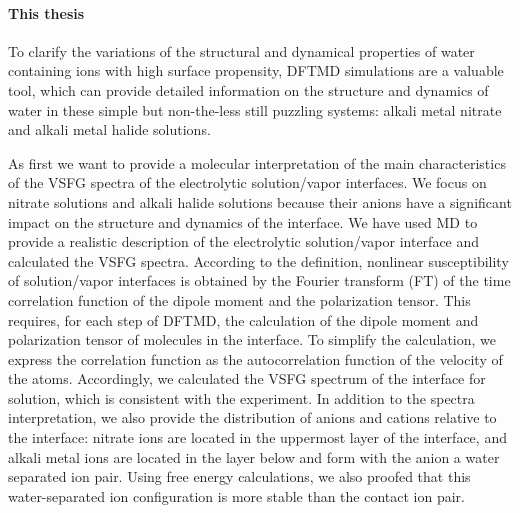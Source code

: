 \paragraph{This thesis}
%
To clarify the variations of the structural and dynamical properties 
of water containing ions with high surface propensity, DFTMD simulations are a valuable tool, 
which can provide detailed information on the structure and dynamics  
of water in these simple but non-the-less still puzzling systems: alkali metal nitrate and alkali metal halide solutions\cite{KM98}.

As first we want to provide a molecular interpretation of the main characteristics of the
VSFG spectra of the electrolytic solution/vapor interfaces.
We focus on nitrate solutions and alkali halide solutions because their anions have a significant impact on the structure and dynamics of the interface.
We have used \abinitio MD to provide a realistic description of the electrolytic solution/vapor interface and calculated the VSFG spectra.
According to the definition, nonlinear susceptibility of solution/vapor interfaces is obtained by the Fourier transform (FT) of 
the time correlation function of the dipole moment and the polarization tensor. This requires, for each step of DFTMD, 
the calculation of the dipole moment and polarization tensor of molecules in the interface. 
To simplify the calculation, we express the correlation function 
as the autocorrelation function of the velocity of the atoms. 
Accordingly, we calculated the VSFG spectrum of the interface for \LiN solution,
which is consistent with the experiment. 
In addition to the spectra interpretation, we also provide the distribution of anions 
and cations relative to the interface: nitrate ions are located in the uppermost layer of the interface, 
and alkali metal ions are located in the layer below and form with the anion a water separated ion pair. 
Using free energy calculations, we also proofed that this water-separated ion configuration is more stable than the contact ion pair.

